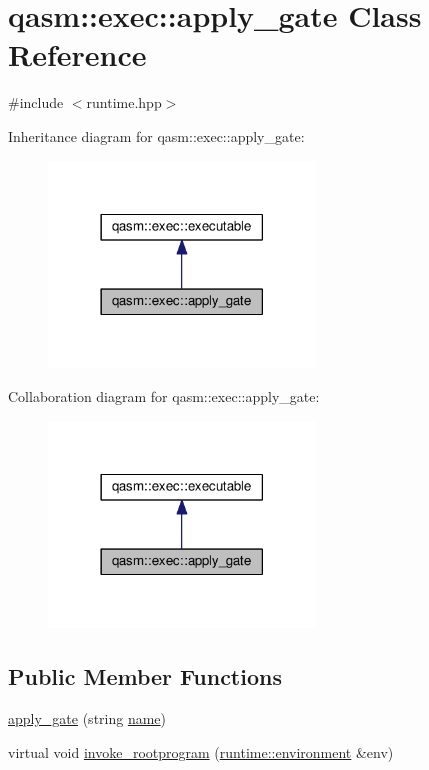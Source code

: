 \hypertarget{classqasm_1_1exec_1_1apply__gate}{}\section{qasm\+:\+:exec\+:\+:apply\+\_\+gate Class Reference}
\label{classqasm_1_1exec_1_1apply__gate}


{\ttfamily \#include $<$runtime.\+hpp$>$}



Inheritance diagram for qasm\+:\+:exec\+:\+:apply\+\_\+gate\+:\nopagebreak
\begin{figure}[H]
\begin{center}
\leavevmode
\includegraphics[width=201pt]{classqasm_1_1exec_1_1apply__gate__inherit__graph}
\end{center}
\end{figure}


Collaboration diagram for qasm\+:\+:exec\+:\+:apply\+\_\+gate\+:\nopagebreak
\begin{figure}[H]
\begin{center}
\leavevmode
\includegraphics[width=201pt]{classqasm_1_1exec_1_1apply__gate__coll__graph}
\end{center}
\end{figure}
\subsection*{Public Member Functions}
\begin{DoxyCompactItemize}
\item 
\hyperlink{classqasm_1_1exec_1_1apply__gate_a0e7787396ea68b95df1e6a395cd21f2e}{apply\+\_\+gate} (string \hyperlink{classqasm_1_1exec_1_1apply__gate_a2b5eea4ddab7101ab5353ecd160e0d30}{name})
\item 
virtual void \hyperlink{classqasm_1_1exec_1_1apply__gate_a4ab94a7feee1830b4be52a487e9cdef5}{invoke\+\_\+rootprogram} (\hyperlink{classqasm_1_1runtime_1_1environment}{runtime\+::environment} \&env)
\end{DoxyCompactItemize}
